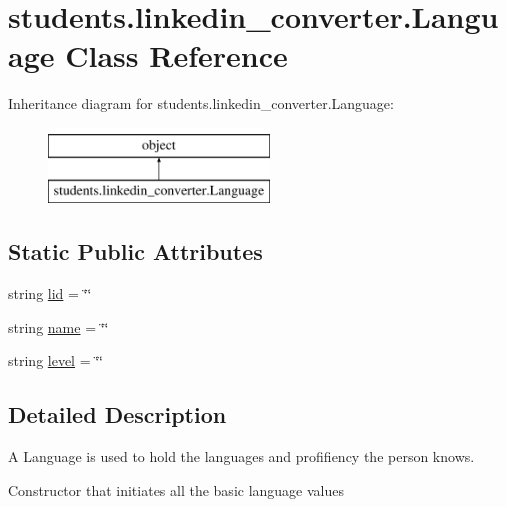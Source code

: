 \hypertarget{classstudents_1_1linkedin__converter_1_1_language}{\section{students.\-linkedin\-\_\-converter.\-Language Class Reference}
\label{classstudents_1_1linkedin__converter_1_1_language}
}
Inheritance diagram for students.\-linkedin\-\_\-converter.\-Language\-:\begin{figure}[H]
\begin{center}
\leavevmode
\includegraphics[height=2.000000cm]{classstudents_1_1linkedin__converter_1_1_language}
\end{center}
\end{figure}
\subsection*{Static Public Attributes}
\begin{DoxyCompactItemize}
\item 
string \hyperlink{classstudents_1_1linkedin__converter_1_1_language_a6da003395448aa81cf8c21c7c8d82631}{lid} = \char`\"{}\char`\"{}
\item 
string \hyperlink{classstudents_1_1linkedin__converter_1_1_language_a49e40399b6750244a4ceb0af02735441}{name} = \char`\"{}\char`\"{}
\item 
string \hyperlink{classstudents_1_1linkedin__converter_1_1_language_a8f85e43a3425592d3b1b65aae235d098}{level} = \char`\"{}\char`\"{}
\end{DoxyCompactItemize}


\subsection{Detailed Description}
\begin{DoxyVerb}A Language is used to hold the languages and profifiency the person knows.\end{DoxyVerb}
\begin{DoxyVerb}Constructor that initiates all the basic language values\end{DoxyVerb}
 

